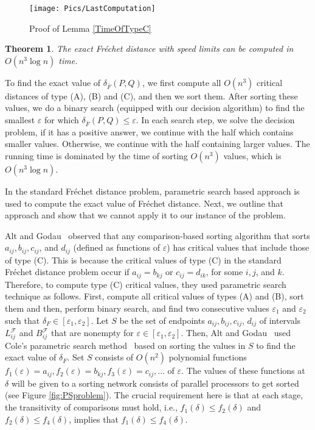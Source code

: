 \documentclass[12pt]{dalthesis}
\def\favoritefont{\bfseries \sffamily}
\def\QED{\ensuremath{{\Box}}}
\def\markatright#1{\leavevmode\unskip\nobreak\quad\hspace*{\fill}{#1}}
\newenvironment{proof}
	{\begin{trivlist}\item[\hskip\labelsep{\favoritefont Proof:}]}
	{\markatright{\QED}\end{trivlist}}
\newtheorem{theorem}{Theorem}
\newcommand{\lee}{\leqslant}
\newcommand{\eps}{\varepsilon}
\newcommand{\CF}{{\mathscr F}}
\newcommand{\Frechet}{Fr\'echet }
\newcommand{\distF}{\delta_F}
\newcommand{\distFS}{\delta_{\bar{F}}} \newcommand{\distWeakF}{\delta_{\bar{N}}} \newcommand{\distClosedF}{\delta_{\bar{C}}} \newcommand{\distPartialF}{\delta_{\bar{P}}} \newcommand{\distGrpahF}{\delta_{\bar{G}}} \newcommand{\distDisF}{\delta_{dF}} \newcommand{\distGeoF}{\delta_{\hat{F}}} \newcommand{\distHomF}{\delta_{h}} \newcommand{\distC}{\delta_C} \newcommand{\distSetF}{\delta_{\CF}}
\newcommand{\LF}{L^\CF}
\newcommand{\BF}{B^\CF}
\begin{document}
\begin{figure}[t]
	\centering
	\texttt{[image: Pics/LastComputation]}  
	\caption{Proof of Lemma \ref{TimeOfTypeC}}
	\label{fig:TimeOfTypeC}
\end{figure}








\begin{theorem}
	The exact \Frechet distance with speed limits can be computed in $O(n^3 \log n)$ time.
\end{theorem}
\begin{proof}
To find the exact value of $\distFS(P,Q)$,
we first compute all $O(n^3)$ critical distances of type (A), (B) and (C), 
and then we sort them. After sorting these values,
we do a binary search
(equipped with our decision algorithm)
to find the smallest $\eps$ for which $\distFS(P,Q) \lee \eps$.
In each search step, we solve the 
decision problem, if it has a positive answer, 
we continue with the half which contains 
smaller values. Otherwise, we continue with the half containing larger values.
The running time is dominated by the time of sorting $O(n^3)$ values, 
which is $O(n^3 \log n)$.
\end{proof}



In the standard \Frechet distance problem, 
parametric search based approach is used to compute the exact value of \Frechet distance. 
Next, we outline that approach and show that we cannot apply it to our instance of the problem.

Alt and Godau~\cite{AltG95} observed that
any comparison-based sorting algorithm that sorts
$a_{ij}, b_{ij}, c_{ij}$, and $d_{ij}$ 
(defined as functions of $\eps$)
has critical values that include those of type (C).
This is because the critical values of type (C) in the
standard \Frechet distance problem occur if 
$a_{ij} = b_{kj}$ or $c_{ij} = d_{ik}$,
for some $i,j$, and $k$. 
Therefore, to compute type (C) critical values, 
they   
used parametric search technique as follows.
First, compute all critical values of types (A) and (B), sort them
and then, perform binary search, and find two consecutive values  
$\eps_1$ and $\eps_2$ such that $\distF \in [\eps_1,\eps_2]$.
Let $S$ be the set of endpoints $a_{ij}, b_{ij}, c_{ij}$, $d_{ij}$ of intervals  
$\LF_{ij}$ and $\BF_{ij}$ that are nonempty for $\eps \in [\eps_1,\eps_2]$.
Then, Alt and Godau~\cite{AltG95} used Cole's parametric search method~\cite{Cole87}  
based on sorting the values in $S$ 
to find the exact value of $\distF$. 
Set $S$ consists of $O(n^2)$ polynomial functions 
$f_1(\eps) = a_{ij}, f_2 (\eps)=b_{kj}, f_3(\eps) = c_{ij}, ...$ 
of $\eps$. The values of these functions at 
$\delta$ will be given to a sorting network 
consists of parallel processors to get sorted (see Figure \ref{fig:PSproblem}).  
The crucial  requirement here is 
that at each stage,  
the transitivity of comparisons must hold, 
i.e.,  $f_1(\delta) \le f_2(\delta)$
and $f_2(\delta) \le f_4(\delta)$, implies that
$f_1(\delta) \le f_4(\delta)$. 
\end{document}
